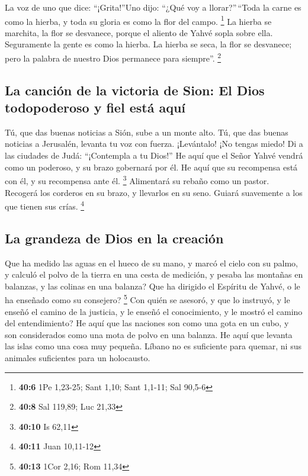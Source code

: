  La voz de uno que dice: ``¡Grita!''Uno dijo: ``¿Qué voy a
llorar?''\,``Toda la carne es como la hierba, y toda su gloria es como
la flor del campo. \footnote{\textbf{40:6} 1Pe 1,23-25; Sant 1,10; Sant
  1,1-11; Sal 90,5-6}  La hierba se marchita, la flor se
desvanece, porque el aliento de Yahvé sopla sobre ella. Seguramente la
gente es como la hierba.  La hierba se seca, la flor se
desvanece; pero la palabra de nuestro Dios permanece para siempre''.
\footnote{\textbf{40:8} Sal 119,89; Luc 21,33}

\hypertarget{la-canciuxf3n-de-la-victoria-de-sion-el-dios-todopoderoso-y-fiel-estuxe1-aquuxed}{%
\subsection{La canción de la victoria de Sion: El Dios todopoderoso y
fiel está
aquí}\label{la-canciuxf3n-de-la-victoria-de-sion-el-dios-todopoderoso-y-fiel-estuxe1-aquuxed}}

 Tú, que das buenas noticias a Sión, sube a un monte alto.
Tú, que das buenas noticias a Jerusalén, levanta tu voz con fuerza.
¡Levántalo! ¡No tengas miedo! Di a las ciudades de Judá: ``¡Contempla a
tu Dios!''  He aquí que el Señor Yahvé vendrá como un
poderoso, y su brazo gobernará por él. He aquí que su recompensa está
con él, y su recompensa ante él. \footnote{\textbf{40:10} Is 62,11}
 Alimentará su rebaño como un pastor. Recogerá los
corderos en su brazo, y llevarlos en su seno. Guiará suavemente a los
que tienen sus crías. \footnote{\textbf{40:11} Juan 10,11-12}

\hypertarget{la-grandeza-de-dios-en-la-creaciuxf3n}{%
\subsection{La grandeza de Dios en la
creación}\label{la-grandeza-de-dios-en-la-creaciuxf3n}}

 Que ha medido las aguas en el hueco de su mano, y marcó
el cielo con su palmo, y calculó el polvo de la tierra en una cesta de
medición, y pesaba las montañas en balanzas, y las colinas en una
balanza?  Que ha dirigido el Espíritu de Yahvé, o le ha
enseñado como su consejero? \footnote{\textbf{40:13} 1Cor 2,16; Rom
  11,34}  Con quién se asesoró, y que lo instruyó, y le
enseñó el camino de la justicia, y le enseñó el conocimiento, y le
mostró el camino del entendimiento?  He aquí que las
naciones son como una gota en un cubo, y son considerados como una mota
de polvo en una balanza. He aquí que levanta las islas como una cosa muy
pequeña.  Líbano no es suficiente para quemar, ni sus
animales suficientes para un holocausto.

